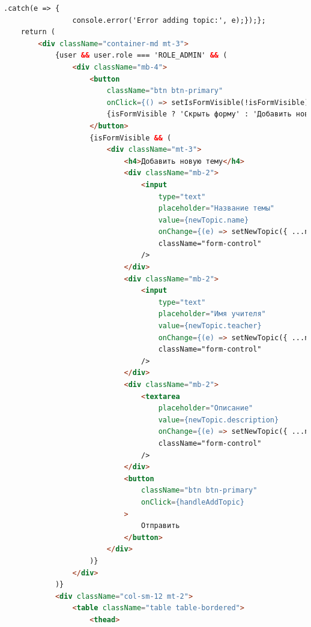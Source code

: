\documentclass[14pt]{extarticle} %
\begin{document}
\begin{lstlisting}[language=html, caption={Клиентская часть TopicFreeList}]
            .catch(e => {
                console.error('Error adding topic:', e);});};
    return (
        <div className="container-md mt-3">
            {user && user.role === 'ROLE_ADMIN' && (
                <div className="mb-4">
                    <button 
                        className="btn btn-primary" 
                        onClick={() => setIsFormVisible(!isFormVisible)}>
                        {isFormVisible ? 'Скрыть форму' : 'Добавить новую тему'}
                    </button>
                    {isFormVisible && (
                        <div className="mt-3">
                            <h4>Добавить новую тему</h4>
                            <div className="mb-2">
                                <input 
                                    type="text" 
                                    placeholder="Название темы" 
                                    value={newTopic.name} 
                                    onChange={(e) => setNewTopic({ ...newTopic, name: e.target.value })} 
                                    className="form-control" 
                                />
                            </div>
                            <div className="mb-2">
                                <input 
                                    type="text" 
                                    placeholder="Имя учителя" 
                                    value={newTopic.teacher} 
                                    onChange={(e) => setNewTopic({ ...newTopic, teacher: e.target.value })} 
                                    className="form-control" 
                                />
                            </div>
                            <div className="mb-2">
                                <textarea 
                                    placeholder="Описание" 
                                    value={newTopic.description} 
                                    onChange={(e) => setNewTopic({ ...newTopic, description: e.target.value })} 
                                    className="form-control" 
                                />
                            </div>
                            <button 
                                className="btn btn-primary" 
                                onClick={handleAddTopic}
                            >
                                Отправить
                            </button>
                        </div>
                    )}
                </div>
            )}
            <div className="col-sm-12 mt-2">
                <table className="table table-bordered">
                    <thead>

\end{lstlisting}
\end{document}
